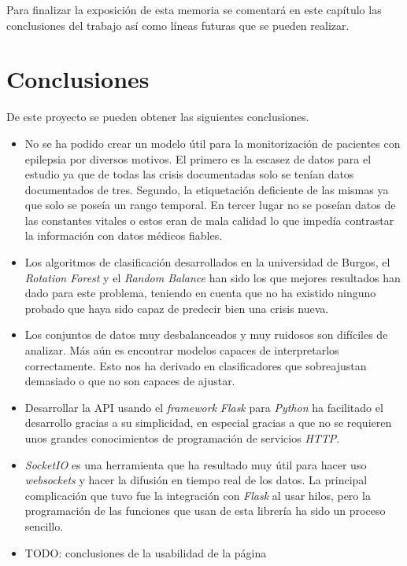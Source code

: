 
Para finalizar la exposición de esta memoria se comentará en este capítulo las conclusiones del trabajo así como líneas futuras que se pueden realizar.

\section{Conclusiones}
De este proyecto se pueden obtener las siguientes conclusiones.
\begin{itemize}
	\item No se ha podido crear un modelo útil para la monitorización de pacientes con epilepsia por diversos motivos. El primero es la escasez de datos para el estudio ya que de todas las crisis documentadas solo se tenían datos documentados de tres. Segundo, la etiquetación deficiente de las mismas ya que solo se poseía un rango temporal. En tercer lugar no se poseían datos de las constantes vitales o estos eran de mala calidad lo que impedía contrastar la información con datos médicos fiables.
	\item Los algoritmos de clasificación desarrollados en la universidad de Burgos, el \textit{Rotation Forest} y el \textit{Random Balance} han sido los que mejores resultados han dado para este problema, teniendo en cuenta que no ha existido ninguno probado que haya sido capaz de predecir bien una crisis nueva.
	\item Los conjuntos de datos muy desbalanceados y muy ruidosos son difíciles de analizar. Más aún es encontrar modelos capaces de interpretarlos correctamente. Esto nos ha derivado en clasificadores que sobreajustan demasiado o que no son capaces de ajustar.
	\item Desarrollar la API usando el \textit{framework} \textit{Flask} para \textit{Python} ha facilitado el desarrollo gracias a su simplicidad, en especial gracias a que no se requieren unos grandes conocimientos de programación de servicios \textit{HTTP}.
	\item \textit{SocketIO} es una herramienta que ha resultado muy útil para hacer uso \textit{websockets} y hacer la difusión en tiempo real de los datos. La principal complicación que tuvo fue la integración con \textit{Flask} al usar hilos, pero la programación de las funciones que usan de esta librería ha sido un proceso sencillo. 
	\item TODO: conclusiones de la usabilidad de la página
\end{itemize}

